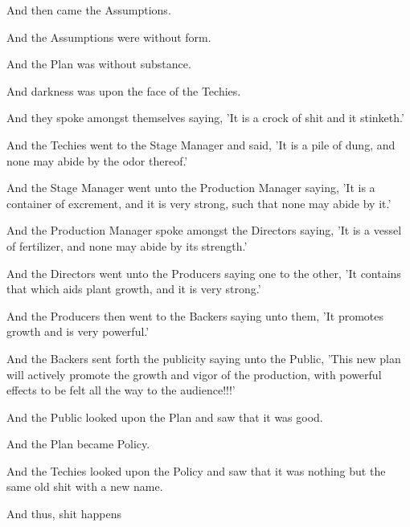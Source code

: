 \documentclass[10pt,a4paper,oneside]{article}
\begin{document}
And then came the Assumptions.

And the Assumptions were without form.

And the Plan was without substance.

And darkness was upon the face of the Techies.

And they spoke amongst themselves saying, 'It is a crock of shit and it stinketh.'

And the Techies went to the Stage Manager and said, 'It is a pile of dung, and none may abide by the odor thereof.'

And the Stage Manager went unto the Production Manager saying, 'It is a container of excrement, and it is very strong, such that none may abide by it.'

And the Production Manager spoke amongst the Directors saying, 'It is a vessel of fertilizer, and none may abide by its strength.'

And the Directors went unto the Producers saying one to the other, 'It contains that which aids plant growth, and it is very strong.'

And the Producers then went to the Backers saying unto them, 'It promotes growth and is very powerful.'

And the Backers sent forth the publicity saying unto the Public, 'This new plan will actively promote the growth and vigor of the production, with powerful effects to be felt all the way to the audience!!!'

And the Public looked upon the Plan and saw that it was good.

And the Plan became Policy.

And the Techies looked upon the Policy and saw that it was nothing but the same old shit with a new name.

And thus, shit happens
\end{document}
